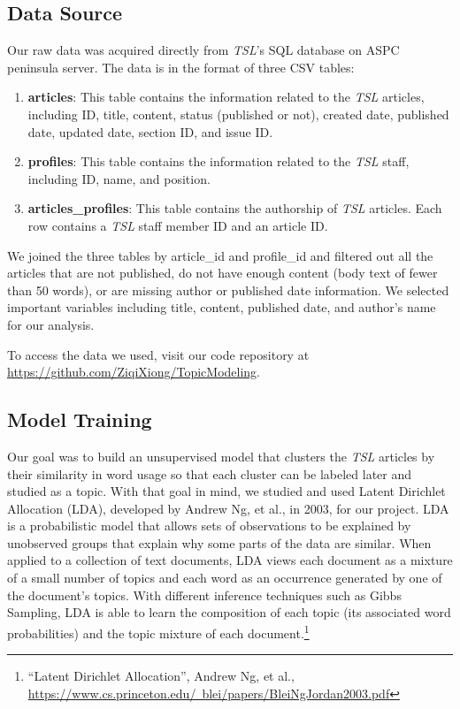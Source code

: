 \documentclass[a4paper]{article}
\begin{document}
\subsection{Data Source}

Our raw data was acquired directly from \textit{TSL}'s SQL database on ASPC peninsula server. The data is in the format of three CSV tables: 

\begin{enumerate}
\item \textbf{articles}: This table contains the information related to the \textit{TSL} articles, including ID, title, content, status (published or not), created date, published date, updated date, section ID, and issue ID.
\item \textbf{profiles}: This table contains the information related to the \textit{TSL} staff, including ID, name, and position.
\item \textbf{articles\_profiles}: This table contains the authorship of \textit{TSL} articles. Each row contains a \textit{TSL} staff member ID and an article ID.
\end{enumerate}

We joined the three tables by article\_id and profile\_id and filtered out all the articles that are not published, do not have enough content (body text of fewer than 50 words), or are missing author or published date information. We selected important variables including title, content, published date, and author's name for our analysis.

To access the data we used, visit our code repository at \href{https://github.com/ZiqiXiong/TopicModeling}{https://github.com/ZiqiXiong/TopicModeling}.

\subsection{Model Training}

Our goal was to build an unsupervised model that clusters the \textit{TSL} articles by their similarity in word usage so that each cluster can be labeled later and studied as a topic. With that goal in mind, we studied and used Latent Dirichlet Allocation (LDA), developed by Andrew Ng, et al., in 2003, for our project. LDA is a probabilistic model that allows sets of observations to be explained by unobserved groups that explain why some parts of the data are similar. When applied to a collection of text documents, LDA views each document as a mixture of a small number of topics and each word as an occurrence generated by one of the document's topics. With different inference techniques such as Gibbs Sampling, LDA is able to learn the composition of each topic (its associated word probabilities) and the topic mixture of each document.\footnote{``Latent Dirichlet Allocation'', Andrew Ng, et al., \href{https://www.cs.princeton.edu/~blei/papers/BleiNgJordan2003.pdf}{https://www.cs.princeton.edu/~blei/papers/BleiNgJordan2003.pdf}}
\end{document}
